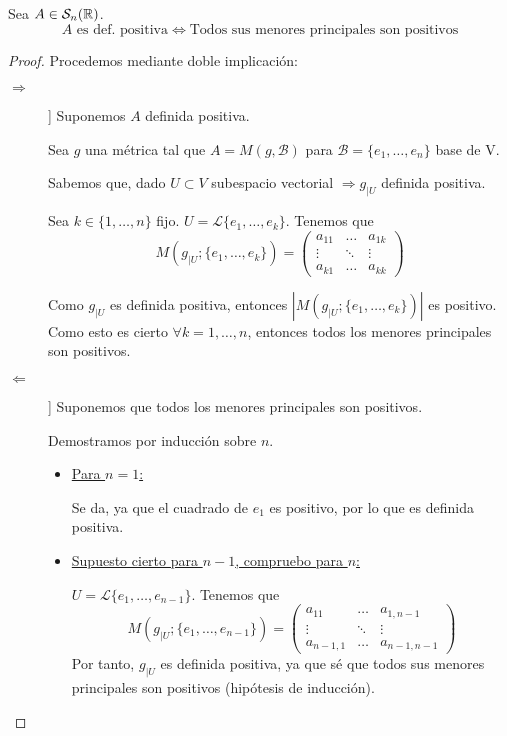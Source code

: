 \begin{teo}
    Sea $A\in\mathcal{S}_n(\mathbb{R})$.
    $$A\text{ es def. positiva} \Longleftrightarrow \text{Todos sus menores principales son positivos}$$

    \begin{proof} Procedemos mediante doble implicación:
    \begin{description}
        \item [$\Longrightarrow$]] Suponemos $A$ definida positiva.
        
        Sea $g$ una métrica tal que $A=M(g,\mathcal{B})$ para $\mathcal{B}=\{e_1,\dots,e_n\}$ base de V.
        
        Sabemos que, dado $U\subset V$ subespacio vectorial $\Longrightarrow g_{\left|U\right.}$ definida positiva.

        Sea $k\in\{1,\dots, n\}$ fijo. $U=\mathcal{L}\{e_1,\dots, e_k\}$.
        Tenemos que $$M(g_{\left|U\right.}; \{e_1,\dots,e_k\}) = \left(\begin{array}{ccc}
            a_{11} &\dots  & a_{1k} \\
            \vdots & \ddots & \vdots \\
            a_{k1} & \dots & a_{kk}
        \end{array}\right)$$

        Como $g_{\left|U\right.}$ es definida positiva, entonces $|M(g_{\left|U\right.}; \{e_1,\dots,e_k\})|$ es positivo. Como esto es cierto $\forall k= 1,\dots, n$, entonces todos los menores principales son positivos.

        \item [$\Longleftarrow$]] Suponemos que todos los menores principales son positivos.

        Demostramos por inducción sobre $n$.
        \begin{itemize}
            \item \underline{Para $n=1$:}
            
            Se da, ya que el cuadrado de $e_1$ es positivo, por lo que es definida positiva.
            
            \item \underline{Supuesto cierto para $n-1$, compruebo para $n$:}

            $U=\mathcal{L}\{e_1,\dots, e_{n-1}\}$.
            Tenemos que $$M(g_{\left|U\right.}; \{e_1,\dots,e_{n-1}\}) = \left(\begin{array}{ccc}
                a_{11} &\dots  & a_{1,{n-1}} \\
                \vdots & \ddots & \vdots \\
                a_{{n-1},1} & \dots & a_{{n-1},{n-1}}
            \end{array}\right)$$
            Por tanto, $g_{\left|U\right.}$ es definida positiva, ya que sé que todos sus menores principales son positivos (hipótesis de inducción).


\end{itemize}
\end{description}
\end{proof}
\end{teo}
